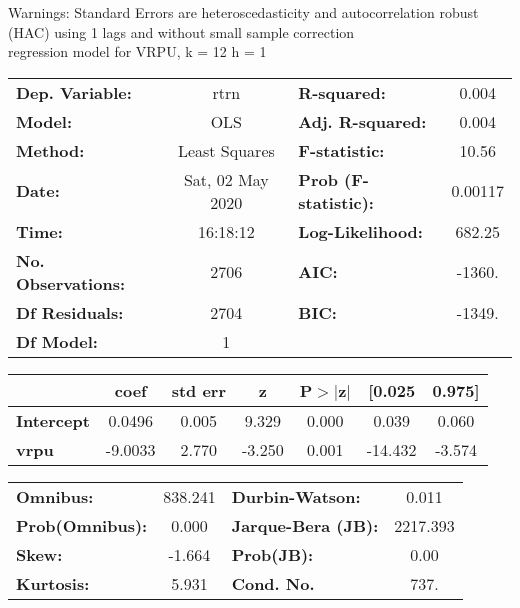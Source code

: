 Warnings: \newline
 [1] Standard Errors are heteroscedasticity and autocorrelation robust (HAC) using 1 lags and without small sample correction\\ 

regression model for VRPU, k = 12 h = 1\begin{center}
\begin{tabular}{lclc}
\toprule
\textbf{Dep. Variable:}    &       rtrn       & \textbf{  R-squared:         } &     0.004   \\
\textbf{Model:}            &       OLS        & \textbf{  Adj. R-squared:    } &     0.004   \\
\textbf{Method:}           &  Least Squares   & \textbf{  F-statistic:       } &     10.56   \\
\textbf{Date:}             & Sat, 02 May 2020 & \textbf{  Prob (F-statistic):} &  0.00117    \\
\textbf{Time:}             &     16:18:12     & \textbf{  Log-Likelihood:    } &    682.25   \\
\textbf{No. Observations:} &        2706      & \textbf{  AIC:               } &    -1360.   \\
\textbf{Df Residuals:}     &        2704      & \textbf{  BIC:               } &    -1349.   \\
\textbf{Df Model:}         &           1      & \textbf{                     } &             \\
\bottomrule
\end{tabular}
\begin{tabular}{lcccccc}
                   & \textbf{coef} & \textbf{std err} & \textbf{z} & \textbf{P$> |$z$|$} & \textbf{[0.025} & \textbf{0.975]}  \\
\midrule
\textbf{Intercept} &       0.0496  &        0.005     &     9.329  &         0.000        &        0.039    &        0.060     \\
\textbf{vrpu}      &      -9.0033  &        2.770     &    -3.250  &         0.001        &      -14.432    &       -3.574     \\
\bottomrule
\end{tabular}
\begin{tabular}{lclc}
\textbf{Omnibus:}       & 838.241 & \textbf{  Durbin-Watson:     } &    0.011  \\
\textbf{Prob(Omnibus):} &   0.000 & \textbf{  Jarque-Bera (JB):  } & 2217.393  \\
\textbf{Skew:}          &  -1.664 & \textbf{  Prob(JB):          } &     0.00  \\
\textbf{Kurtosis:}      &   5.931 & \textbf{  Cond. No.          } &     737.  \\
\bottomrule
\end{tabular}
\end{center}

